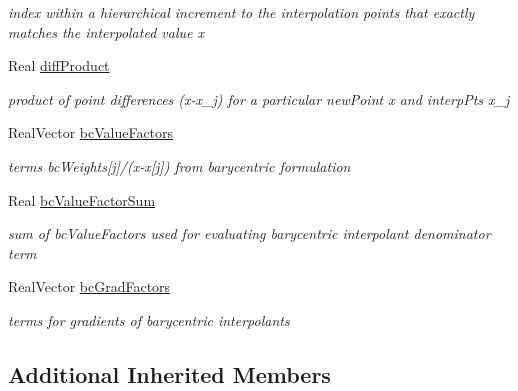 \begin{DoxyCompactItemize}
\begin{DoxyCompactList}\small\item\em index within a hierarchical increment to the interpolation points that exactly matches the interpolated value x \end{DoxyCompactList}\item 
Real \hyperlink{classPecos_1_1LagrangeInterpPolynomial_a0782385d3528cb761abfcc6ea2b3fd5a}{diff\+Product}\label{classPecos_1_1LagrangeInterpPolynomial_a0782385d3528cb761abfcc6ea2b3fd5a}

\begin{DoxyCompactList}\small\item\em product of point differences (x-\/x\+\_\+j) for a particular new\+Point x and interp\+Pts x\+\_\+j \end{DoxyCompactList}\item 
Real\+Vector \hyperlink{classPecos_1_1LagrangeInterpPolynomial_a13d3692709e894353a15de77679689c5}{bc\+Value\+Factors}\label{classPecos_1_1LagrangeInterpPolynomial_a13d3692709e894353a15de77679689c5}

\begin{DoxyCompactList}\small\item\em terms bc\+Weights\mbox{[}j\mbox{]}/(x-\/x\mbox{[}j\mbox{]}) from barycentric formulation \end{DoxyCompactList}\item 
Real \hyperlink{classPecos_1_1LagrangeInterpPolynomial_afa0ec5fd637f41c0510e9114da41d68d}{bc\+Value\+Factor\+Sum}\label{classPecos_1_1LagrangeInterpPolynomial_afa0ec5fd637f41c0510e9114da41d68d}

\begin{DoxyCompactList}\small\item\em sum of bc\+Value\+Factors used for evaluating barycentric interpolant denominator term \end{DoxyCompactList}\item 
Real\+Vector \hyperlink{classPecos_1_1LagrangeInterpPolynomial_a4e3c6bbd363dee4bef97ea9621d54b75}{bc\+Grad\+Factors}\label{classPecos_1_1LagrangeInterpPolynomial_a4e3c6bbd363dee4bef97ea9621d54b75}

\begin{DoxyCompactList}\small\item\em terms for gradients of barycentric interpolants \end{DoxyCompactList}\end{DoxyCompactItemize}
\subsection*{Additional Inherited Members}


